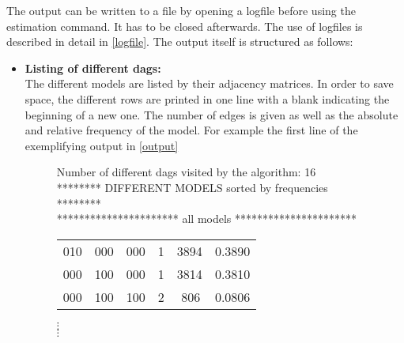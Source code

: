 The output can be written to a file by opening a logfile before
using the estimation command. It has to be closed afterwards. The
use of logfiles is described in detail in \autoref{logfile}. The
output itself is structured as follows:
\begin{itemize}
\item {\bf Listing of different dags:}\\
The different models are listed by their adjacency matrices. In
order to save space, the different rows are printed in one line
with a blank indicating the beginning of a new one. The number of
edges is given as well as the absolute and relative frequency of
the model. For example the first line of the exemplifying output
in \autoref{output}
%
\begin{figure}
\begin{center}
{\it

Number of different dags visited by the algorithm: 16 \\[0.5cm]
******** DIFFERENT MODELS sorted by frequencies  ******** \\
********************** all models ********************** \\[0.2cm]

\begin{tabular}{llllll}
010 \hspace{0.2cm}& 000 \hspace{0.2cm}& 000 \hspace{0.5cm}&    1  \hspace{0.5cm}& 3894  \hspace{0.5cm}&  0.3890 \\
000 \hspace{0.2cm}& 100 \hspace{0.2cm}& 000 \hspace{0.5cm}&    1  \hspace{0.5cm}& 3814  \hspace{0.5cm}&  0.3810 \\
000 \hspace{0.2cm}& 100 \hspace{0.2cm}& 100 \hspace{0.5cm}&    2
\hspace{0.5cm}& \,\,806   \hspace{0.5cm}&  0.0806
\end{tabular}
}


$\vdots$ \\[-0.15cm]
$\vdots$


\end{center}
\end{figure}
\end{itemize}
